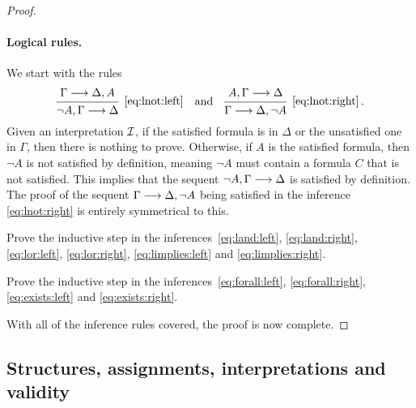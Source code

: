 \documentclass[11pt,a4paper]{article}
\begin{document}
\begin{proof}
    \paragraph{Logical rules.}
    We start with the rules
    \begin{equation*}
        \begin{prooftree}
            \hypo{\Gamma\seq\Delta,A}
            \infer1[\eqref{eq:lnot:left}]{\lnot A, \Gamma\seq\Delta}
        \end{prooftree}
        \quad\text{and}\quad
        \begin{prooftree}
            \hypo{A, \Gamma\seq\Delta}
            \infer1[\eqref{eq:lnot:right}]{\Gamma\seq\Delta, \lnot A}
        \end{prooftree}\,.
    \end{equation*}
    Given an interpretation \(\mathcal{I}\),
    if the satisfied formula is in \(\Delta\) or the unsatisfied
    one in \(\Gamma\), then there is nothing to prove.
    Otherwise, if \(A\) is the satisfied formula,
    then \(\lnot A\) is not satisfied by definition,
    meaning \(\lnot A\) must contain a formula \(C\) that is not satisfied.
    This implies that the sequent \(\lnot A,\Gamma\longrightarrow\Delta\) is satisfied by definition.
    The proof of the sequent \(\Gamma\longrightarrow\Delta,\lnot A\) being satisfied
    in the inference \eqref{eq:lnot:right} is entirely symmetrical to this.

    \begin{exercise}[Exercise 8.2.1]\label{exe:8.2.1}
        Prove the inductive step in the inferences~\eqref{eq:land:left},
        \eqref{eq:land:right}, \eqref{eq:lor:left}, \eqref{eq:lor:right},
        \eqref{eq:limplies:left} and \eqref{eq:limplies:right}.
    \end{exercise}

    \begin{exercise}[Exercise 8.2.2]\label{exe:8.2.2}
        Prove the inductive step in the inferences~\eqref{eq:forall:left},
        \eqref{eq:forall:right}, \eqref{eq:exists:left} and \eqref{eq:exists:right}.
    \end{exercise}

    With all of the inference rules covered, the proof is now complete.
\end{proof}

\subsection{Structures, assignments, interpretations and validity}
\end{document}
